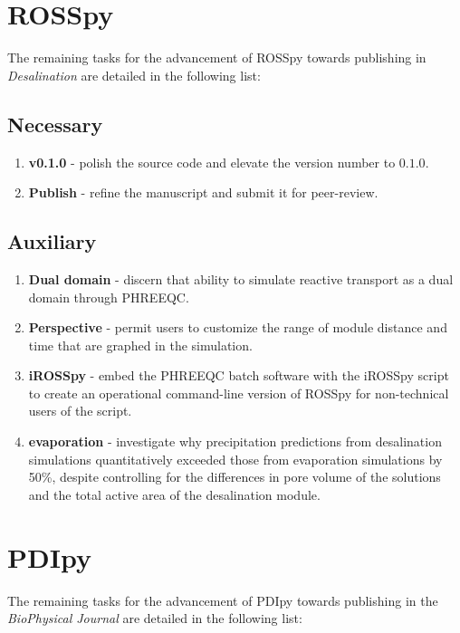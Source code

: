 
\section{ROSSpy}
The remaining tasks for the advancement of ROSSpy towards publishing in \textit{Desalination} are detailed in the following list:
\subsection{Necessary}
\begin{enumerate}
    \item \textbf{v0.1.0} - polish the source code and elevate the version number to $0.1.0$.
    \item \textbf{Publish} - refine the manuscript and submit it for peer-review.
\end{enumerate}

\subsection{Auxiliary}
\begin{enumerate}
    \item \textbf{Dual domain} - discern that ability to simulate reactive transport as a dual domain through PHREEQC.
    \item \textbf{Perspective} - permit users to customize the range of module distance and time that are graphed in the simulation.
    \item \textbf{iROSSpy} - embed the PHREEQC batch software with the iROSSpy script to create an operational command-line version of ROSSpy for non-technical users of the script.
    \item \textbf{evaporation} - investigate why precipitation predictions from desalination simulations quantitatively exceeded those from evaporation simulations by 50\%, despite controlling for the differences in pore volume of the solutions and the total active area of the desalination module.
\end{enumerate}

\section{PDIpy}
The remaining tasks for the advancement of PDIpy towards publishing in the \textit{BioPhysical Journal} are detailed in the following list:
